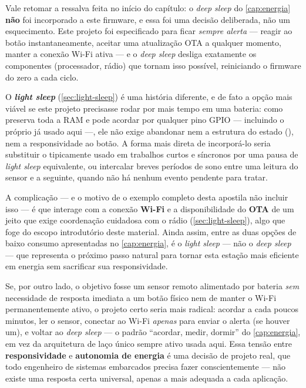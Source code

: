 Vale retomar a ressalva feita no início do capítulo: o \emph{deep sleep} do \cref{cap:energia} \textbf{não} foi incorporado a este firmware, e essa foi uma decisão deliberada, não um esquecimento. Este projeto foi especificado para ficar \emph{sempre alerta} — reagir ao botão instantaneamente, aceitar uma atualização OTA a qualquer momento, manter a conexão Wi-Fi ativa — e o \emph{deep sleep} desliga exatamente os componentes (processador, rádio) que tornam isso possível, reiniciando o firmware do zero a cada ciclo.

O \textbf{\emph{light sleep}} (\cref{sec:light-sleep}) é uma história diferente, e de fato a opção mais viável se este projeto precisasse rodar por mais tempo em uma bateria: como preserva toda a RAM e pode acordar por qualquer pino GPIO — incluindo o próprio  já usado aqui —, ele não exige abandonar nem a estrutura do estado (), nem a responsividade ao botão. A forma mais direta de incorporá-lo seria substituir o  tipicamente usado em trabalhos curtos e síncronos por uma pausa de \emph{light sleep} equivalente, ou intercalar breves períodos de sono entre uma leitura do sensor e a seguinte, quando não há nenhum evento pendente para tratar.

A complicação — e o motivo de o exemplo completo desta apostila não incluir isso — é que  interage com a conexão \textbf{Wi-Fi} e a disponibilidade do \textbf{OTA} de um jeito que exige coordenação cuidadosa com o rádio (\cref{sec:light-sleep}), algo que foge do escopo introdutório deste material. Ainda assim, entre as duas opções de baixo consumo apresentadas no \cref{cap:energia}, é o \emph{light sleep} — não o \emph{deep sleep} — que representa o próximo passo natural para tornar esta estação mais eficiente em energia sem sacrificar sua responsividade.

Se, por outro lado, o objetivo fosse um sensor remoto alimentado por bateria \emph{sem} necessidade de resposta imediata a um botão físico nem de manter o Wi-Fi permanentemente ativo, o projeto certo seria mais radical: acordar a cada poucos minutos, ler o sensor, conectar ao Wi-Fi \emph{apenas} para enviar o alerta (se houver um), e voltar ao \emph{deep sleep} — o padrão ``acordar, medir, dormir'' do \cref{cap:energia}, em vez da arquitetura de laço único sempre ativo usada aqui. Essa tensão entre \textbf{responsividade} e \textbf{autonomia de energia} é uma decisão de projeto real, que todo engenheiro de sistemas embarcados precisa fazer conscientemente — não existe uma resposta certa universal, apenas a mais adequada a cada aplicação.

